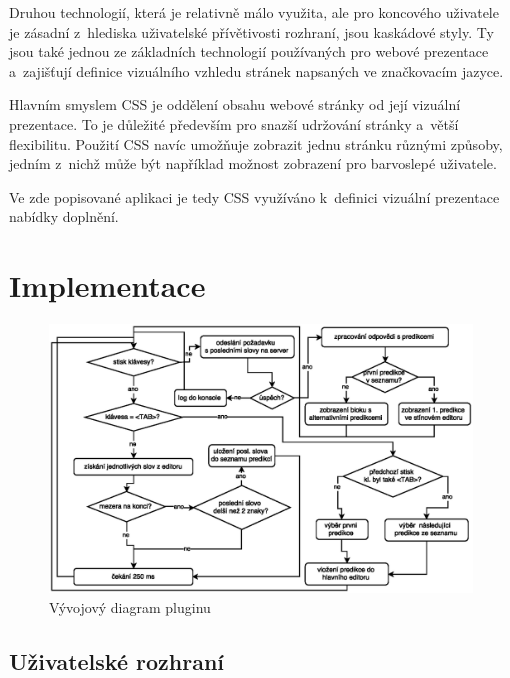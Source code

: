\documentclass[a4paper,11pt,openany]{book} %
\begin{document}
\begin{spacing}{1.05}
Druhou technologií, která je relativně málo využita, ale pro koncového uživatele je zásadní z~hlediska uživatelské přívětivosti rozhraní, jsou kaskádové styly. Ty jsou také jednou ze základních technologií používaných pro webové prezentace a~zajišťují definice vizuálního vzhledu stránek napsaných ve značkovacím jazyce. \parencite{meyer2004cascading}

Hlavním smyslem CSS je oddělení obsahu webové stránky od její vizuální prezentace. To je důležité především pro snazší udržování stránky a~větší flexibilitu. Použití CSS navíc umožňuje zobrazit jednu stránku různými způsoby, jedním z~nichž může být například možnost zobrazení pro barvoslepé uživatele.

Ve zde popisované aplikaci je tedy CSS využíváno k~definici vizuální prezentace nabídky doplnění.
\end{spacing}

\chapter{Implementace}

\begin{figure}[h]
	\centering
	\includegraphics[width=1.0\textwidth]{autocomplete_floatchart.eps}
	\caption{Vývojový diagram pluginu}
	\label{fig:autocomplete_floatchart}
\end{figure}

\section{Uživatelské rozhraní}\label{ui}
\end{document}
